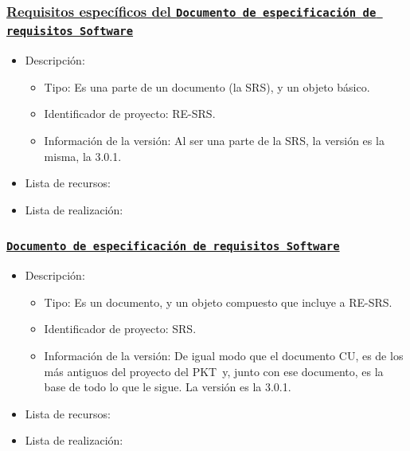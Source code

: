 \documentclass[spanish,a4paper,11pt, twoside]{report}	%
\newcommand*{\PKT}{\hbox{P}\kern-2.5pt\lower3.5pt\hbox{\small{K}}\kern-2.8pt\hbox{T}\kern-2pt}	%
\begin{document}
			\subsubsection{\underline{Requisitos específicos del \texttt{Documento de especificación de requisitos Software}}}
			\begin{itemize}	
				\item{Descripción:}
					\begin{itemize}	
						\item{Tipo:} Es una parte de un documento (la SRS), y un objeto básico. 
						\item{Identificador de proyecto:} RE-SRS.
						\item{Información de la versión:} Al ser una parte de la SRS, la versión es la misma, la 3.0.1.
					\end{itemize}	
				\item{Lista de recursos:}
				\item{Lista de realización:}
			\end{itemize}		

			\subsubsection{\texttt{\underline{Documento de especificación de requisitos Software}}}
			\begin{itemize}	
				\item{Descripción:}
					\begin{itemize}	
						\item{Tipo:} Es un documento, y un objeto compuesto que incluye a RE-SRS. 
						\item{Identificador de proyecto:} SRS.
						\item{Información de la versión:} De igual modo que el documento CU, es de los más antiguos del proyecto del \PKT \ y, junto con ese documento, es la base de todo lo que le sigue. La versión es la 3.0.1.
					\end{itemize}	
				\item{Lista de recursos:}
				\item{Lista de realización:}
			\end{itemize}			
\end{document}
